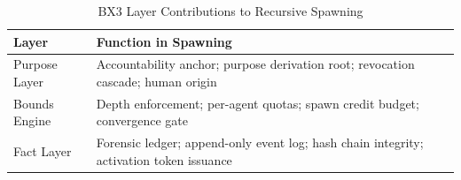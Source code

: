 \begin{table}[ht]
\centering
\caption{BX3 Layer Contributions to Recursive Spawning}
\label{tab:bx3-spawn-layers}
\begin{tabular}{@{}ll@{}}
\toprule
\textbf{Layer} & \textbf{Function in Spawning} \\ \midrule
Purpose Layer & Accountability anchor; purpose derivation root; revocation cascade; human origin \\
Bounds Engine & Depth enforcement; per-agent quotas; spawn credit budget; convergence gate \\
Fact Layer & Forensic ledger; append-only event log; hash chain integrity; activation token issuance \\
\bottomrule
\end{tabular}
\end{table}
